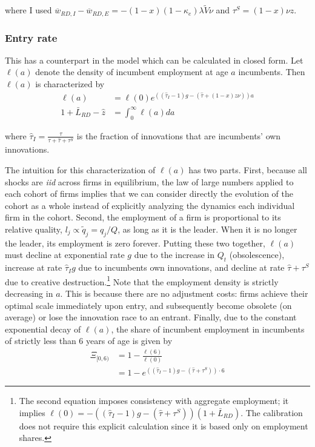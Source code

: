 \documentclass[11pt,english]{article}
\theoremstyle{remark}
\begin{document}
where I used $\overline{w}_{RD,I} - \overline{w}_{RD,E} = -(1-x)(1-\kappa_e) \lambda \tilde{V} \nu$ and $\tau^S = (1-x)\nu z$. 

\subsubsection{Entry rate}

This has a counterpart in the model which can be calculated in closed form. Let $\ell(a)$ denote the density of incumbent employment at age $a$ incumbents. Then $\ell(a)$ is characterized by 
\begin{align*}
\ell(a) &= \ell(0)e^{((\hat{\tau}_I -1)g - (\hat{\tau} + (1-x)z \nu))a}  \\
1 + \bar{L}_{RD} - \hat{z} &= \int_0^{\infty} \ell(a) da
\end{align*}

where $\hat{\tau}_I = \frac{\tau}{\tau + \hat{\tau} + \tau^S}$ is the fraction of innovations that are incumbents' own innovations. 

The intuition for this characterization of $\ell(a)$ has two parts. First, because all shocks are \textit{iid} across firms in equilibrium, the law of large numbers applied to each cohort of firms implies that we can consider directly the evolution of the cohort as a whole instead of explicitly analyzing the dynamics each individual firm in the cohort.  Second, the employment of a firm is proportional to its relative quality, $l_j \propto \tilde{q}_j = q_j / Q$, as long as it is the leader. When it is no longer the leader, its employment is zero forever. Putting these two together, $\ell(a)$ must decline at exponential rate $g$ due to the increase in $Q_t$ (obsolescence), increase at rate $\hat{\tau}_I g$ due to incumbents own innovations, and decline at rate $\hat{\tau} + \tau^S$ due to creative destruction.\footnote{The second equation imposes consistency with aggregate employment; it implies $\ell(0) = -((\hat{\tau}_I -1)g - (\hat{\tau} + \tau^S))(1 + \bar{L}_{RD})$. The calibration does not require this explicit calculation since it is based only on employment shares.} Note that the employment density is strictly decreasing in $a$. This is because there are no adjustment costs: firms achieve their optimal scale immediately upon entry, and subsequently become obsolete (on average) or lose the innovation race to an entrant. Finally, due to the constant exponential decay of $\ell(a)$, the share of incumbent employment in incumbents of strictly less than 6 years of age is given by 
\begin{align*}
\Xi_{[0,6)} &=  1 - \frac{\ell(6)}{\ell(0)} \\
&= 1 - e^{((\hat{\tau}_I -1)g - (\hat{\tau} + \tau^S))\cdot 6}
\end{align*}  
\end{document}
